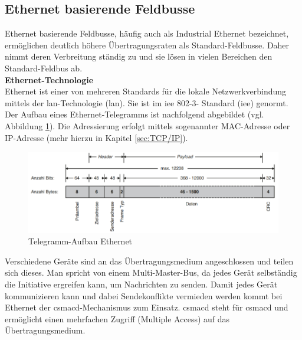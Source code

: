 \documentclass[ a4paper,
                oneside,
                toc=bibliography,
                toc=listof
                ]{scrbook}
\begin{document}
	\subsection{Ethernet basierende Feldbusse}
	\label{subsec:EthernetFeldbus}
	Ethernet basierende Feldbusse, häufig auch als \glqq Industrial Ethernet\grqq{} bezeichnet, ermöglichen deutlich höhere Übertragungsraten als Standard-Feldbusse. Daher nimmt deren Verbreitung ständig zu und sie lösen in vielen Bereichen den Standard-Feldbus ab. \cite{hering2012elektrotechnik}\\
	\textbf{Ethernet-Technologie}\\
	Ethernet ist einer von mehreren Standards für die lokale Netzwerkverbindung mittels der \acs{lan}-Technologie (\acl{lan}). Sie ist im \acl{iee} 802-3- Standard (\acl{iee}) genormt. Der Aufbau eines Ethernet-Telegramms ist nachfolgend abgebildet (vgl. Abbildung \ref{fig:EthernetTelegramm}). Die Adressierung erfolgt mittels sogenannter MAC-Adresse oder IP-Adresse (mehr hierzu in Kapitel \ref{sec:TCP/IP}). \cite{riggert2002rechnernetze}\\
	\begin{figure}[!ht]
		\centering
		\includegraphics[width=1.0\linewidth]{./images/Ethernet-Telegram.png}
		\caption{Telegramm-Aufbau Ethernet \cite{hering2012elektrotechnik}}
		\label{fig:EthernetTelegramm}
	\end{figure}
	Verschiedene Geräte sind an das Übertragungsmedium angeschlossen und teilen sich dieses. Man spricht von einem Multi-Master-Bus, da jedes Gerät selbständig die Initiative ergreifen kann, um Nachrichten zu senden. Damit jedes Gerät kommunizieren kann und dabei Sendekonflikte vermieden werden kommt bei Ethernet der \acs{csmacd}-Mechanismus zum Einsatz. \acs{csmacd} steht für \glqq \acl{csmacd}\grqq{} und ermöglicht einen mehrfachen Zugriff (Multiple Access) auf das Übertragungsmedium. \cite{hering2012elektrotechnik} \cite{riggert2002rechnernetze}
\end{document}
